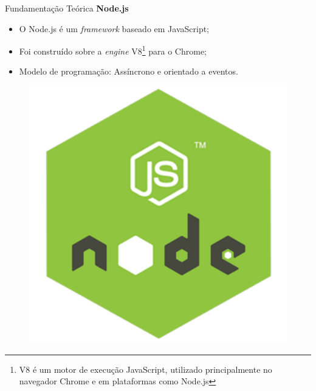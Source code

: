 \documentclass{libs/ufc_format}
\begin{document}
\begin{frame}{Fundamentação Teórica}
    \textbf{Node.js}\nocite{nodejs}\let\thefootnote\relax{}
    \begin{multicols}{2}
        \begin{itemize}
            \item O Node.js é um \textit{framework} baseado em JavaScript;
            \item Foi construído sobre a \textit{engine} V8\footnote{\hspace*{1cm}V8 é um motor de execução JavaScript, utilizado principalmente no navegador Chrome e em plataformas como Node.js} para o Chrome;
            \item Modelo de programação: Assíncrono e orientado a eventos.
        \end{itemize}
        \begin{figure}[H]
            \centering
            \includegraphics[width=0.8\linewidth]{figuras/logo-nodejs.pdf}
            \captionsetup{justification=centering}
            \label{fig:modelo-rest-api}
        \end{figure}
    \end{multicols}
\end{frame}
\end{document}
